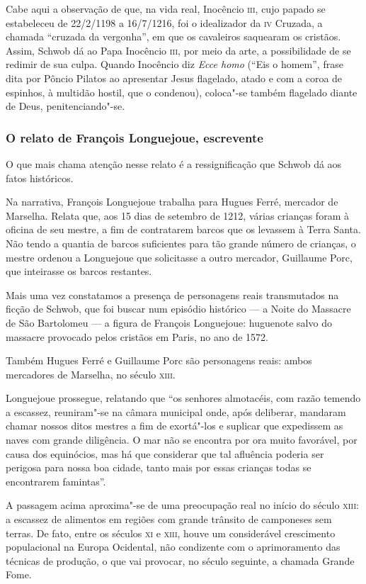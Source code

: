 \documentclass[12pt]{extarticle}
\begin{document}
Cabe aqui a observação de que, na vida real, Inocêncio \textsc{iii}, cujo papado
se estabeleceu de 22/2/1198 a 16/7/1216, foi o idealizador da \textsc{iv}
Cruzada, a chamada ``cruzada da vergonha'', em que os cavaleiros
saquearam os cristãos. Assim, Schwob dá ao Papa Inocêncio \textsc{iii}, por meio
da arte, a possibilidade de se redimir de sua culpa. Quando Inocêncio
diz \textit{Ecce homo} (``Eis o homem'', frase dita por Pôncio Pilatos ao
apresentar Jesus flagelado, atado e com a coroa de espinhos, à
multidão hostil, que o condenou), coloca"-se também flagelado diante de
Deus, penitenciando"-se.


\subsubsection{O relato de François Longuejoue, escrevente}

O que mais chama atenção nesse relato é a ressignificação que Schwob dá
aos fatos históricos.

Na narrativa, François Longuejoue trabalha para Hugues Ferré, mercador
de Marselha. Relata que, aos 15 dias de setembro de 1212, várias
crianças foram à oficina de seu mestre, a fim de contratarem barcos que
os levassem à Terra Santa. Não tendo a quantia de barcos suficientes
para tão grande número de crianças, o mestre ordenou a Longuejoue que
solicitasse a outro mercador, Guillaume Porc, que inteirasse os barcos
restantes.

Mais uma vez constatamos a presença de personagens reais transmutados na
ficção de Schwob, que foi buscar num episódio histórico --- a Noite do
Massacre de São Bartolomeu ---  a figura de François Longuejoue:
huguenote salvo do massacre provocado pelos cristãos em Paris, no ano de
1572.

Também Hugues Ferré e Guillaume Porc são personagens reais: ambos
mercadores de Marselha, no século \textsc{xiii}.

Longuejoue prossegue, relatando que ``os senhores almotacéis, com razão
temendo a escassez, reuniram"-se na câmara municipal onde, após
deliberar, mandaram chamar nossos ditos mestres a fim de exortá"-los e
suplicar que expedissem as naves com grande diligência. O mar não se
encontra por ora muito favorável, por causa dos equinócios, mas há que
considerar que tal afluência poderia ser perigosa para nossa boa cidade,
tanto mais por essas crianças todas se encontrarem famintas''.

A passagem acima aproxima"-se de uma preocupação real no início do século
\textsc{xiii}: a escassez de alimentos em regiões com grande trânsito de
camponeses sem terras. De fato, entre os séculos \textsc{xi} e \textsc{xiii}, houve um
considerável crescimento populacional na Europa Ocidental, não
condizente com o aprimoramento das técnicas de produção, o que vai
provocar, no século seguinte, a chamada Grande Fome.
\end{document}
